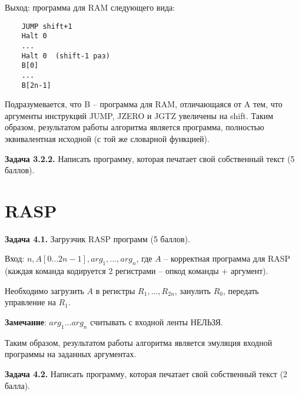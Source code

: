 \documentclass[a4paper, 10pt]{extarticle}
\newcommand{\Task}[1]{\textbf{Задача #1.}}
\begin{document}
Выход: программа для RAM следующего вида:
\begin{verbatim}
    JUMP shift+1
    Halt 0
    ...
    Halt 0  (shift-1 раз)
    B[0]
    ...
    B[2n-1]
\end{verbatim}

Подразумевается, что B -- программа для RAM, отличающаяся от A тем, что аргументы инструкций JUMP, JZERO и JGTZ увеличены на shift.
Таким образом, результатом работы алгоритма является программа, полностью эквивалентная исходной (с той же словарной функцией).

\Task{3.2.2} Написать программу, которая печатает свой собственный текст (5 баллов).

\newpage
\section{RASP}

\Task{4.1} Загрузчик RASP программ (5 баллов). 

Вход: $n, A[0 ... 2n-1], arg_1, ..., arg_n$, где $A$ -- корректная программа для RASP (каждая команда 
кодируется 2 регистрами -- опкод команды + аргумент).

Необходимо загрузить $A$ в регистры $R_1, ..., R_{2n}$, занулить $R_0$, передать управление на $R_1$. 

\textbf{Замечание}: $arg_1 ... arg_n$ считывать с входной ленты НЕЛЬЗЯ.

Таким образом, результатом работы алгоритма является эмуляция входной программы на заданных аргументах.

\Task{4.2} Написать программу, которая печатает свой собственный текст (2 балла).
\end{document}
